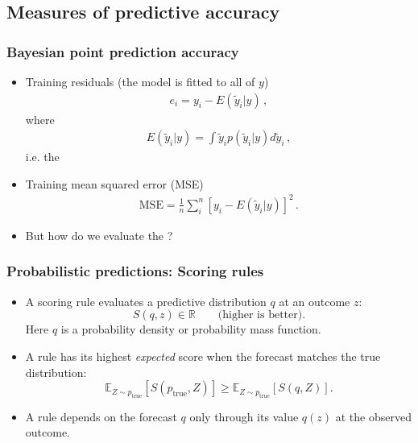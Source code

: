 \documentclass[10pt]{beamer}
\begin{document}
\subsection{Measures of predictive accuracy}
\frame{\subsectionpage}

\begin{frame}

\frametitle{Bayesian point prediction accuracy}

    \begin{itemize}
      \item Training residuals (the model is fitted to all of $y$)
      \begin{align*}
        e_i =  y_i - E(\tilde{y}_i|y)\,,
      \end{align*}
      where
      \begin{align*}
        E(\tilde{y}_i|y) = \int \tilde{y}_i p(\tilde{y}_i|y) d\tilde{y}_i\,,
      \end{align*}
      i.e. the 
      \pause
      \item Training mean squared error (MSE)
      \begin{align*}
        \text{MSE} = \frac{1}{n}\sum^n_i [y_i - E(\tilde{y}_i|y)]^2 \,.
      \end{align*}
      \pause
      \item But how do we evaluate the ?
    \end{itemize}

\end{frame}


\begin{frame}
\frametitle{Probabilistic predictions: Scoring rules}

  \begin{itemize}
      \item A scoring rule evaluates a predictive distribution $q$ at an outcome $z$:
      \[
      S(q,z)\in\mathbb R\qquad\text{(higher is better).}
      \]
      Here $q$ is a probability density or probability mass function.
      \pause
      \item A  rule has its highest \emph{expected} score when the
        forecast matches the true distribution:
            \[
            \mathbb{E}_{Z\sim p_{\mathrm{true}}}[S(p_{\mathrm{true}},Z)]
            \geq \mathbb{E}_{Z\sim p_{\mathrm{true}}}[S(q,Z)].
            \]
        \pause
      \item A  rule depends on the forecast $q$ only through its
        value $q(z)$ at the observed outcome.
  \end{itemize}

\end{frame}
\end{document}
